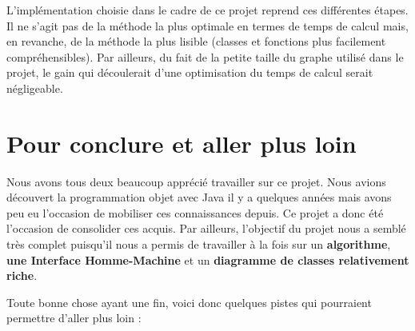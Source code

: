 \documentclass[,french]{article}
\begin{document}
L'implémentation choisie dans le cadre de ce projet reprend ces
différentes étapes. Il ne s'agit pas de la méthode la plus optimale en
termes de temps de calcul mais, en revanche, de la méthode la plus
lisible (classes et fonctions plus facilement compréhensibles). Par
ailleurs, du fait de la petite taille du graphe utilisé dans le projet,
le gain qui découlerait d'une optimisation du temps de calcul serait
négligeable.

\hypertarget{sec:amelioration}{%
\section{Pour conclure et aller plus loin}\label{sec:amelioration}}

Nous avons tous deux beaucoup apprécié travailler sur ce projet. Nous
avions découvert la programmation objet avec Java il y a quelques années
mais avons peu eu l'occasion de mobiliser ces connaissances depuis. Ce
projet a donc été l'occasion de consolider ces acquis. Par ailleurs,
l'objectif du projet nous a semblé très complet puisqu'il nous a permis
de travailler à la fois sur un \textbf{algorithme}, \textbf{une
Interface Homme-Machine} et un \textbf{diagramme de classes relativement
riche}.

Toute bonne chose ayant une fin, voici donc quelques pistes qui
pourraient permettre d'aller plus loin :
\end{document}
